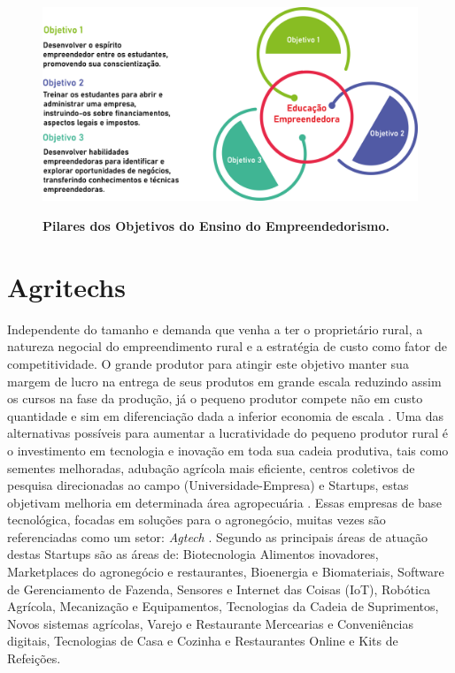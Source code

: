 \begin{figure}[htb]
\centering
\caption{\textbf{Pilares dos Objetivos do Ensino do Empreendedorismo.}}
\includegraphics[scale=0.3]{Imagens/figura2.png}
\label{figura_2}
\end{figure}

\section{Agritechs}

Independente do tamanho e demanda que venha a ter o proprietário rural, a natureza negocial do empreendimento rural e a estratégia de custo como fator de competitividade. O grande produtor para atingir este objetivo manter sua margem de lucro na entrega de seus produtos em grande escala reduzindo assim os cursos na fase da produção, já o pequeno produtor compete não em custo quantidade e sim em diferenciação dada a inferior economia de escala \cite{soares_relacao_2017}. Uma das alternativas possíveis para aumentar a lucratividade do pequeno produtor rural é o investimento em tecnologia e inovação em toda sua cadeia produtiva, tais como sementes melhoradas, adubação agrícola mais eficiente, centros coletivos de pesquisa direcionadas ao campo (Universidade-Empresa) \cite{bochi_dorneles_coletivos_2014, gomes_inovacao_2014} e Startups, estas objetivam melhoria em determinada área agropecuária \cite{junior_agtechs:_2019}. Essas empresas de base tecnológica, focadas em soluções para o agronegócio, muitas vezes são referenciadas como um setor: \textit{Agtech} \cite{blanco_agtechs:_2019}. Segundo  as principais áreas de atuação destas Startups são as áreas de: Biotecnologia Alimentos inovadores, Marketplaces do agronegócio e restaurantes, Bioenergia e Biomateriais, Software de Gerenciamento de Fazenda, Sensores e Internet das Coisas (IoT), Robótica Agrícola, Mecanização e Equipamentos, Tecnologias da Cadeia de Suprimentos, Novos sistemas agrícolas, Varejo e Restaurante Mercearias e Conveniências digitais, Tecnologias de Casa e Cozinha e Restaurantes Online e Kits de Refeições.




